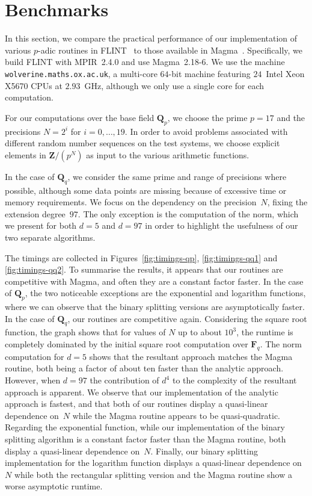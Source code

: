 \section{Benchmarks}

In this section, we compare the practical performance of our implementation 
of various $p$-adic routines in {\sc FLINT}~\citep{FLINT} to those available 
in {\sc Magma}~\citep{Magma}.  Specifically, we build {\sc FLINT} with 
{\sc MPIR}~2.4.0 and use {\sc Magma}~2.18-6.  We use the machine 
{\tt wolverine.maths.ox.ac.uk}, a multi-core $64$-bit machine featuring 
$24$~Intel Xeon X5670 CPUs at $2.93$~GHz, although we only use a single 
core for each computation.

For our computations over the base field $\mathbf{Q}_p$, we choose the prime 
$p = 17$ and the precisions \mbox{$N = 2^i$} for $i = 0, \dotsc, 19$.  
In order to avoid problems associated with different random number sequences 
on the test systems, we choose explicit elements in $\mathbf{Z} / (p^N)$ as 
input to the various arithmetic functions.

In the case of $\mathbf{Q}_q$, we consider the same prime and range of 
precisions where possible, although some data points are missing because 
of excessive time or memory requirements.  We focus on the dependency 
on the precision~$N$, fixing the extension degree~$97$.  The only exception 
is the computation of the norm, which we present for both $d = 5$ and $d = 97$ 
in order to highlight the usefulness of our two separate algorithms.

The timings are collected in Figures~\ref{fig:timings-qp}, 
\ref{fig:timings-qq1} and \ref{fig:timings-qq2}.
To summarise the results, it appears that our routines are competitive with 
{\sc Magma}, and often they are a constant factor faster.  In the case of 
$\mathbf{Q}_p$, the two noticeable exceptions are the exponential and 
logarithm functions, where we can observe that the binary splitting versions 
are asymptotically faster.  In the case of $\mathbf{Q}_q$, our routines 
are competitive again.  Considering the square root function, the graph 
shows that for values of $N$ up to about $10^3$, the runtime is completely 
dominated by the initial square root computation over $\mathbf{F}_q$.  
The norm computation for $d=5$ shows that the resultant approach matches 
the {\sc Magma} routine, both being a factor of about ten faster than the 
analytic approach.  However, when $d=97$ the contribution of $d^4$ to the 
complexity of the resultant approach is apparent.  We observe that our 
implementation of the analytic approach is fastest, and that both of our 
routines display a quasi-linear dependence on~$N$ while the {\sc Magma} 
routine appears to be quasi-quadratic.  Regarding the exponential function, 
while our implementation of the binary splitting algorithm is a constant 
factor faster than the {\sc Magma} routine, both display a quasi-linear 
dependence on~$N$.  Finally, our binary splitting implementation for the 
logarithm function displays a quasi-linear dependence on~$N$ while both 
the rectangular splitting version and the {\sc Magma} routine show a worse 
asymptotic runtime.

